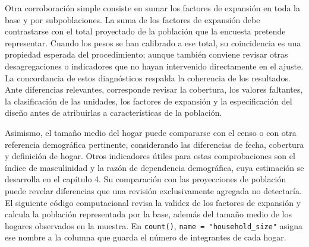 \documentclass[
  spanish,
  11pt,
  letterpaper,
  oneside,
  open=any]{scrbook}
\begin{document}
Otra corroboración simple consiste en sumar los factores de expansión en
toda la base y por subpoblaciones. La suma de los factores de expansión
debe contrastarse con el total proyectado de la población que la
encuesta pretende representar. Cuando los pesos se han calibrado a ese
total, su coincidencia es una propiedad esperada del procedimiento;
aunque también conviene revisar otras desagregaciones o indicadores que
no hayan intervenido directamente en el ajuste. La concordancia de estos
diagnósticos respalda la coherencia de los resultados. Ante diferencias
relevantes, corresponde revisar la cobertura, los valores faltantes, la
clasificación de las unidades, los factores de expansión y la
especificación del diseño antes de atribuirlas a características de la
población.

Asimismo, el tamaño medio del hogar puede compararse con el censo o con
otra referencia demográfica pertinente, considerando las diferencias de
fecha, cobertura y definición de hogar. Otros indicadores útiles para
estas comprobaciones son el índice de masculinidad y la razón de
dependencia demográfica, cuya estimación se desarrolla en el capítulo 4.
Su comparación con las proyecciones de población puede revelar
diferencias que una revisión exclusivamente agregada no detectaría. El
siguiente código computacional revisa la validez de los factores de
expansión y calcula la población representada por la base, además del
tamaño medio de los hogares observados en la muestra. En
\texttt{count()}, \texttt{name\ =\ "household\_size"} asigna ese nombre
a la columna que guarda el número de integrantes de cada hogar.
\end{document}
